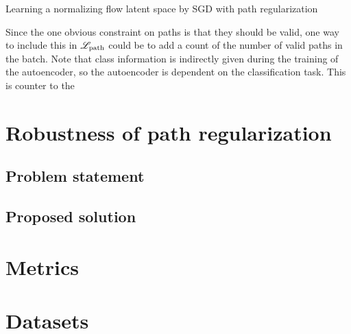 \documentclass[../main.tex]{subfiles}
\begin{document}
\begin{algorithm}
\caption{Learning a normalizing flow latent space by SGD with path regularization}
\label{algo:pathreg}
\end{algorithm}

Since the one obvious constraint on paths is that they should be valid, one way to include this in $\mathscr{L}_\text{path}$ could be to add a count of the number of valid paths in the batch.
Note that class information is indirectly given during the training of the autoencoder, so the autoencoder is dependent on the classification task.
This is counter to the

\section{Robustness of path regularization}

\subsection{Problem statement}

\subsection{Proposed solution}

\section{Metrics}


\section{Datasets}
\end{document}
